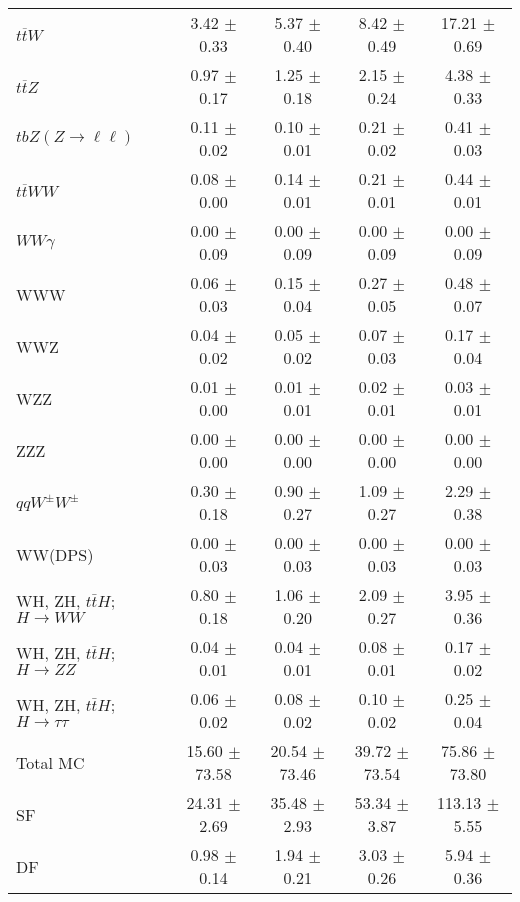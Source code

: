 \begin{tabular}{l|cccc}
                   $t\overline{t}W$ &  3.42 $\pm$  0.33 &  5.37 $\pm$  0.40 &  8.42 $\pm$  0.49 & 17.21 $\pm$  0.69 \\
                   $t\overline{t}Z$ &  0.97 $\pm$  0.17 &  1.25 $\pm$  0.18 &  2.15 $\pm$  0.24 &  4.38 $\pm$  0.33 \\
    $tbZ (Z \rightarrow \ell \ell)$ &  0.11 $\pm$  0.02 &  0.10 $\pm$  0.01 &  0.21 $\pm$  0.02 &  0.41 $\pm$  0.03 \\
                  $t\overline{t}WW$ &  0.08 $\pm$  0.00 &  0.14 $\pm$  0.01 &  0.21 $\pm$  0.01 &  0.44 $\pm$  0.01 \\
                         $WW\gamma$ &  0.00 $\pm$  0.09 &  0.00 $\pm$  0.09 &  0.00 $\pm$  0.09 &  0.00 $\pm$  0.09 \\
                                WWW &  0.06 $\pm$  0.03 &  0.15 $\pm$  0.04 &  0.27 $\pm$  0.05 &  0.48 $\pm$  0.07 \\
                                WWZ &  0.04 $\pm$  0.02 &  0.05 $\pm$  0.02 &  0.07 $\pm$  0.03 &  0.17 $\pm$  0.04 \\
                                WZZ &  0.01 $\pm$  0.00 &  0.01 $\pm$  0.01 &  0.02 $\pm$  0.01 &  0.03 $\pm$  0.01 \\
                                ZZZ &  0.00 $\pm$  0.00 &  0.00 $\pm$  0.00 &  0.00 $\pm$  0.00 &  0.00 $\pm$  0.00 \\
                 $qqW^{\pm}W^{\pm}$ &  0.30 $\pm$  0.18 &  0.90 $\pm$  0.27 &  1.09 $\pm$  0.27 &  2.29 $\pm$  0.38 \\
                            WW(DPS) &  0.00 $\pm$  0.03 &  0.00 $\pm$  0.03 &  0.00 $\pm$  0.03 &  0.00 $\pm$  0.03 \\
WH, ZH, $t\bar{t}H$; $H \rightarrow WW$ &  0.80 $\pm$  0.18 &  1.06 $\pm$  0.20 &  2.09 $\pm$  0.27 &  3.95 $\pm$  0.36 \\
WH, ZH, $t\bar{t}H$; $H \rightarrow ZZ$ &  0.04 $\pm$  0.01 &  0.04 $\pm$  0.01 &  0.08 $\pm$  0.01 &  0.17 $\pm$  0.02 \\
WH, ZH, $t\bar{t}H$; $H \rightarrow \tau\tau$ &  0.06 $\pm$  0.02 &  0.08 $\pm$  0.02 &  0.10 $\pm$  0.02 &  0.25 $\pm$  0.04 \\
\hline\hline
                           Total MC & 15.60 $\pm$ 73.58 & 20.54 $\pm$ 73.46 & 39.72 $\pm$ 73.54 & 75.86 $\pm$ 73.80 \\
\hline
                                 SF & 24.31 $\pm$  2.69 & 35.48 $\pm$  2.93 & 53.34 $\pm$  3.87 & 113.13 $\pm$  5.55 \\
                                 DF &  0.98 $\pm$  0.14 &  1.94 $\pm$  0.21 &  3.03 $\pm$  0.26 &  5.94 $\pm$  0.36 \\

\end{tabular}
